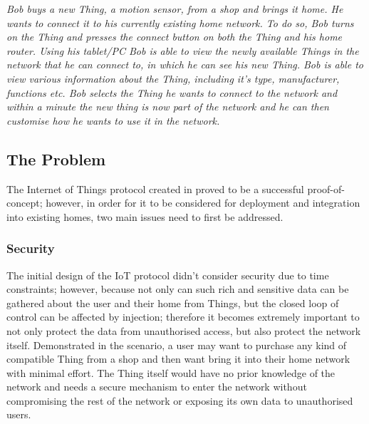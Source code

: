 \documentclass{mprop}
\begin{document}
\textit{Bob buys a new Thing, a motion sensor, from a shop and brings it home. He wants to connect it to his currently existing home network. To do so, Bob turns on the Thing and presses the connect button on both the Thing and his home router. Using his tablet/PC Bob is able to view the newly available Things in the network that he can connect to, in which he can see his new Thing. Bob is able to view various information about the Thing, including it's type, manufacturer, functions etc. Bob selects the Thing he wants to connect to the network and within a minute the new thing is now part of the network and he can then customise how he wants to use it in the network.}

\subsection{The Problem} %
\label{sub:the_problem}
The Internet of Things protocol created in \cite{KNoT} proved to be a successful proof-of-concept; however, in order for it to be considered for deployment and integration into existing homes, two main issues need to first be addressed.

\subsubsection{Security} %
\label{ssub:security}

The initial design of the IoT protocol didn't consider security due to time constraints; however, because not only can such rich and sensitive data can be gathered about the user and their home from Things, but the closed loop of control can be affected by injection; therefore it becomes extremely important to not only protect the data from unauthorised access, but also protect the network itself. Demonstrated in the scenario, a user may want to purchase any kind of compatible Thing from a shop and then want bring it into their home network with minimal effort. The Thing itself would have no prior knowledge of the network and needs a secure mechanism to enter the network without compromising the rest of the network or exposing its own data to unauthorised users. 
\end{document}
